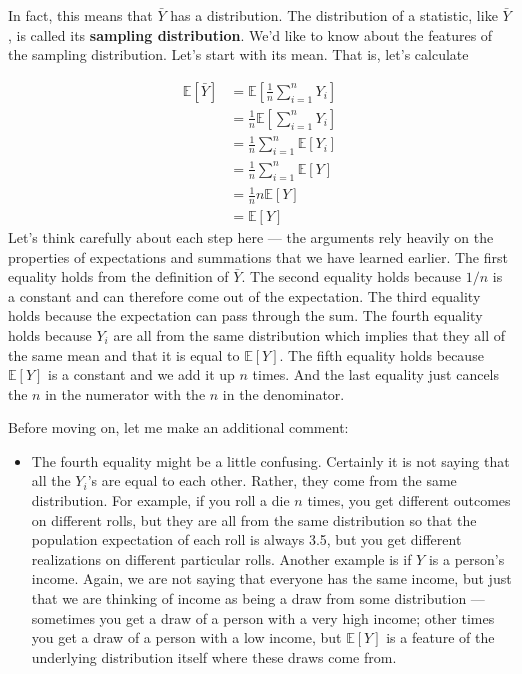 \documentclass[
  letterpaper,
  DIV=11,
  numbers=noendperiod]{scrreprt}
\providecommand{\tightlist}{%
  \setlength{\itemsep}{0pt}\setlength{\parskip}{0pt}}\usepackage{longtable,booktabs,array}
\begin{document}
In fact, this means that \(\bar{Y}\) has a distribution. The
distribution of a statistic, like \(\bar{Y}\), is called its
\textbf{sampling distribution}. We'd like to know about the features of
the sampling distribution. Let's start with its mean. That is, let's
calculate

\[
  \begin{aligned}
    \mathbb{E}[\bar{Y}] &= \mathbb{E}\left[ \frac{1}{n} \sum_{i=1}^n Y_i \right] \\
    &= \frac{1}{n} \mathbb{E}\left[ \sum_{i=1}^n Y_i \right] \\
    &= \frac{1}{n} \sum_{i=1}^n \mathbb{E}[Y_i] \\
    &= \frac{1}{n} \sum_{i=1}^n \mathbb{E}[Y] \\
    &= \frac{1}{n} n \mathbb{E}[Y] \\
    &= \mathbb{E}[Y]
  \end{aligned}
\] Let's think carefully about each step here --- the arguments rely
heavily on the properties of expectations and summations that we have
learned earlier. The first equality holds from the definition of
\(\bar{Y}\). The second equality holds because \(1/n\) is a constant and
can therefore come out of the expectation. The third equality holds
because the expectation can pass through the sum. The fourth equality
holds because \(Y_i\) are all from the same distribution which implies
that they all of the same mean and that it is equal to
\(\mathbb{E}[Y]\). The fifth equality holds because \(\mathbb{E}[Y]\) is
a constant and we add it up \(n\) times. And the last equality just
cancels the \(n\) in the numerator with the \(n\) in the denominator.

Before moving on, let me make an additional comment:

\begin{itemize}
\tightlist
\item
  The fourth equality might be a little confusing. Certainly it is not
  saying that all the \(Y_i\)'s are equal to each other. Rather, they
  come from the same distribution. For example, if you roll a die \(n\)
  times, you get different outcomes on different rolls, but they are all
  from the same distribution so that the population expectation of each
  roll is always 3.5, but you get different realizations on different
  particular rolls. Another example is if \(Y\) is a person's income.
  Again, we are not saying that everyone has the same income, but just
  that we are thinking of income as being a draw from some distribution
  --- sometimes you get a draw of a person with a very high income;
  other times you get a draw of a person with a low income, but
  \(\mathbb{E}[Y]\) is a feature of the underlying distribution itself
  where these draws come from.
\end{itemize}
\end{document}
